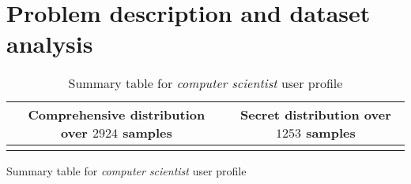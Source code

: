 \documentclass[10pt,a4paper]{article}
\begin{document}
\title{\rmfamily\normalfont{}} 
    \author{\\} \date{\today}
    
    \maketitle

    \begin{abstract}
      This article collects the work I did in order to support my
      Quantitative Systems Analysis exam. The goal is to study
      resources usage respect a collection of user profiles, each one
      of them producing different network traffic and CPU/memory
      consumption patterns in different time windows. I performed some
      experiments repeating them over time, analyzing results with a
      piece of Smalltalk software, initially implemented for the
      problem at hand, but it turns out to be far more general.
    \end{abstract}
       
    \tableofcontents
   
 
    \newpage

    \section{Problem description and dataset analysis}

    \begin{table}
        \begin{tabular}{ c | c }
            Comprehensive distribution over $2924$ samples  &   Secret distribution over $1253$ samples \\
            \hline 
             &  \\
            \hline
        \end{tabular}
      \caption{Summary table for \emph{computer scientist} user profile}
      \label{fig:computer-scientist-user-profile}
    \end{table}

    \lipsum[1]

    \begin{table}
      \begin{adjustwidth}{-4cm}{}
            
      \end{adjustwidth}
      \caption{Summary table for \emph{computer scientist} user profile}
      \label{fig:computer-scientist-user-profile}
    \end{table}
\end{document}
